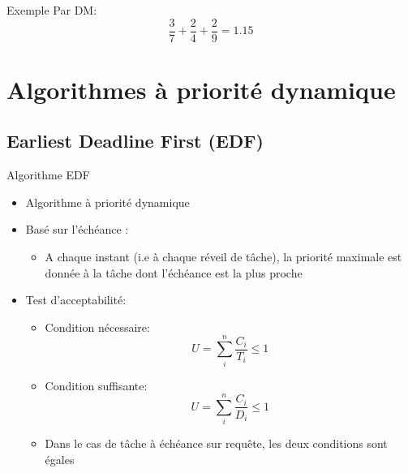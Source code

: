 \begin{frame}{Exemple}
  Par DM:
  $$\frac{3}{7} + \frac{2}{4} + \frac{2}{9} = 1.15$$
\end{frame} 

\section{Algorithmes à priorité dynamique}

\subsection{Earliest Deadline First (EDF)}

\begin{frame}{Algorithme EDF}
  \begin{itemize}
  \item Algorithme à priorité dynamique
  \item Basé sur l'échéance :
    \begin{itemize}
    \item A chaque instant (i.e à chaque réveil de tâche), la priorité
      maximale  est donnée  à la  tâche  dont l'échéance  est la  plus
      proche
    \end{itemize}
  \item Test d'acceptabilité:
    \begin{itemize}
    \item Condition nécessaire:
      $$U = \sum_i^n \frac{C_i}{T_i} ≤ 1$$
    \item Condition suffisante:
      $$U = \sum_i^n \frac{C_i}{D_i} ≤ 1$$
    \item  Dans le  cas  de tâche  à  échéance sur  requête, les  deux
      conditions sont égales
    \end{itemize}
  \end{itemize}
\end{frame}

